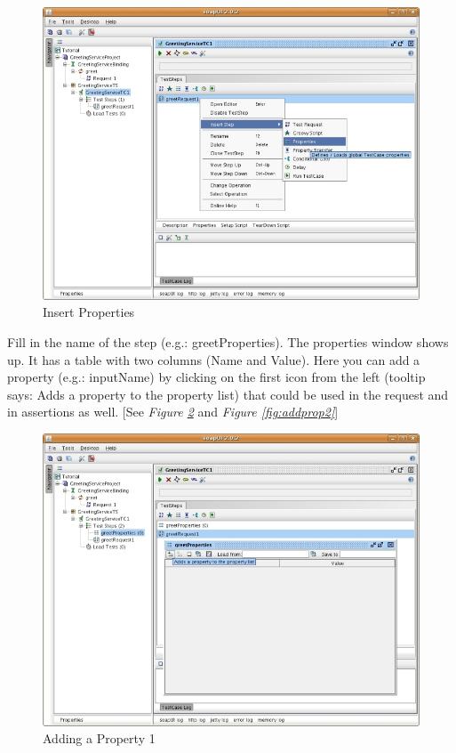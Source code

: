\documentclass{article}
\begin{document}
\begin{figure}[!hbp]
\begin{center}
\includegraphics{fig/ARC1PythonDGDraft-img6_resize.jpg}
\caption{Insert Properties}
\label{fig:insprop}
\end{center}
\end{figure}

Fill in the name of the step (e.g.: greetProperties). The properties
window shows up. It has a table with two columns (Name and
Value). Here you can add a property (e.g.: inputName) by clicking on
the first icon from the left (tooltip says: Adds a property to the
property list) that could be used in the request and in assertions as
well. [See \emph{Figure \ref{fig:addprop1}} and \emph{Figure \ref{fig:addprop2}}]

\begin{figure}[!hbp]
\begin{center}
\includegraphics{fig/ARC1PythonDGDraft-img7_resize.jpg}
\caption{Adding a Property 1}
\label{fig:addprop1}
\end{center}
\end{figure}
\end{document}
